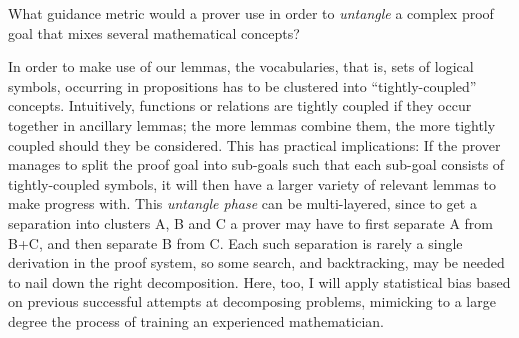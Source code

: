 \begin{researchquestion}
What guidance metric would a prover use in order to \emph{untangle} a complex proof goal that mixes several mathematical concepts?
\end{researchquestion}

In order to make use of our lemmas, the vocabularies, that is, sets of logical symbols, occurring in propositions has to be clustered into ``tightly-coupled'' concepts.
Intuitively, functions or relations are tightly coupled if they occur together in ancillary lemmas; the more lemmas combine them, the more tightly coupled should they be considered.
This has practical implications:
If the prover manages to split the proof goal into sub-goals such that each sub-goal consists of tightly-coupled symbols, it will then have a larger variety of relevant lemmas to make progress with.
This \emph{untangle phase} can be multi-layered, since to get a separation into clusters A, B and C a prover may have to first separate A from B+C, and then separate B from C.
Each such separation is rarely a single derivation in the proof system, so some search, and backtracking, may be needed to nail down the right decomposition.
Here, too, I will apply statistical bias based on previous successful attempts at decomposing problems,
mimicking to a large degree the process of training an experienced mathematician.